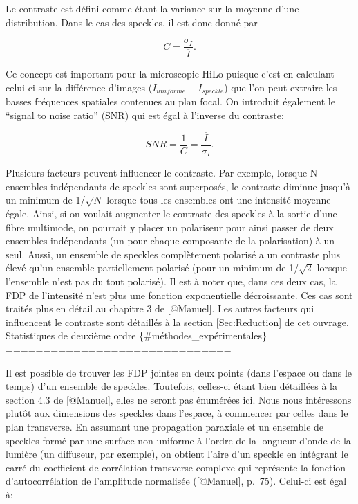 \documentclass[]{article}
\begin{document}
Le contraste est défini comme étant la variance sur la moyenne d'une
distribution. Dans le cas des speckles, il est donc donné par

\[
C = \frac{\sigma_I}{\overline{I}}.
\]

Ce concept est important pour la microscopie HiLo puisque c'est en
calculant celui-ci sur la différence d'images
(\(I_{uniforme}-I_{speckle}\)) que l'on peut extraire les basses
fréquences spatiales contenues au plan focal. On introduit également le
``signal to noise ratio'' (SNR) qui est égal à l'inverse du contraste:

\[
SNR = \frac{1}{C} = \frac{\overline{I}}{\sigma_I}.
\]

Plusieurs facteurs peuvent influencer le contraste. Par exemple, lorsque
N ensembles indépendants de speckles sont superposés, le contraste
diminue jusqu'à un minimum de 1/\(\sqrt{N}\) lorsque tous les ensembles
ont une intensité moyenne égale. Ainsi, si on voulait augmenter le
contraste des speckles à la sortie d'une fibre multimode, on pourrait y
placer un polariseur pour ainsi passer de deux ensembles indépendants
(un pour chaque composante de la polarisation) à un seul. Aussi, un
ensemble de speckles complètement polarisé a un contraste plus élevé
qu'un ensemble partiellement polarisé (pour un minimum de 1/\(\sqrt{2}\)
lorsque l'ensemble n'est pas du tout polarisé). Il est à noter que, dans
ces deux cas, la FDP de l'intensité n'est plus une fonction
exponentielle décroissante. Ces cas sont traités plus en détail au
chapitre 3 de {[}@Manuel{]}. Les autres facteurs qui influencent le
contraste sont détaillés à la section {[}Sec:Reduction{]} de cet
ouvrage.\\
Statistiques de deuxième ordre \{\#méthodes\_expérimentales\}
==============================

Il est possible de trouver les FDP jointes en deux points (dans l'espace
ou dans le temps) d'un ensemble de speckles. Toutefois, celles-ci étant
bien détaillées à la section 4.3 de {[}@Manuel{]}, elles ne seront pas
énumérées ici. Nous nous intéressons plutôt aux dimensions des speckles
dans l'espace, à commencer par celles dans le plan transverse. En
assumant une propagation paraxiale et un ensemble de speckles formé par
une surface non-uniforme à l'ordre de la longueur d'onde de la lumière
(un diffuseur, par exemple), on obtient l'aire d'un speckle en intégrant
le carré du coefficient de corrélation transverse complexe qui
représente la fonction d'autocorrélation de l'amplitude normalisée
({[}@Manuel{]}, p.~75). Celui-ci est égal à:
\end{document}
